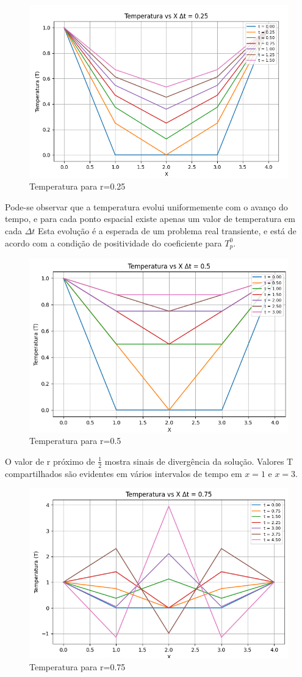 \documentclass[]{article}
\begin{document}
\begin{figure}[h]
	\centering
	\includegraphics[width=.65\textwidth]{figures/36-1}
	\caption{Temperatura para r=0.25}
\end{figure}

Pode-se observar que a temperatura evolui uniformemente com o avanço do tempo, e para cada ponto espacial existe apenas um valor de temperatura em cada $\Delta t$ Esta evolução é a esperada de um problema real transiente, e está de acordo com a condição de positividade do coeficiente para $T_p^{0}$.

\begin{figure}[h]
	\centering
	\includegraphics[width=.65\textwidth]{figures/36-2}
	\caption{Temperatura para r=0.5}
\end{figure}

O valor de r próximo de $\frac{1}{2}$ mostra sinais de divergência da solução. Valores T compartilhados são evidentes em vários intervalos de tempo em $x=1$ e $x=3$.

\begin{figure}[h]
	\centering
	\includegraphics[width=.65\textwidth]{figures/36-3}
	\caption{Temperatura para r=0.75}
\end{figure}
\end{document}
